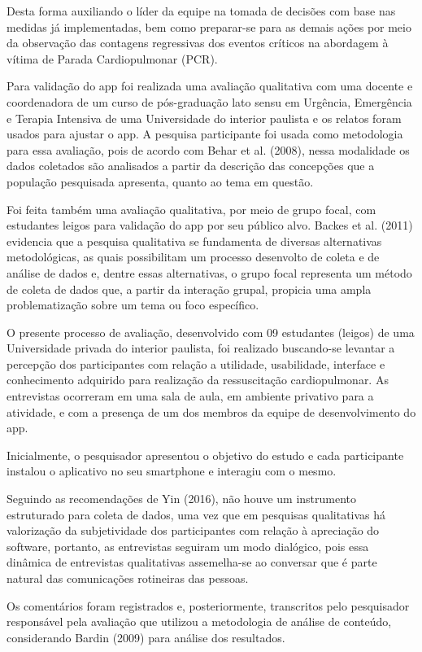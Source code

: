 \documentclass[twoside,twocolumn]{article}
\begin{document}
Desta forma auxiliando o líder da equipe na tomada de decisões com base nas medidas já implementadas, bem como preparar-se para as demais ações por meio da observação das contagens regressivas dos eventos críticos na abordagem à vítima de Parada Cardiopulmonar (PCR).

Para validação do app foi realizada uma avaliação qualitativa com uma docente e coordenadora de  um curso de pós-graduação lato sensu em Urgência, Emergência e Terapia Intensiva de uma Universidade do interior paulista e os relatos foram usados para ajustar o app. A pesquisa  participante foi usada como metodologia para essa avaliação, pois de acordo com Behar et al. (2008), nessa modalidade os dados coletados são analisados a partir da descrição das concepções que a população pesquisada apresenta, quanto ao tema em questão.

Foi feita também uma avaliação qualitativa, por meio de grupo focal, com estudantes leigos para validação do app por seu público alvo. Backes et al. (2011) evidencia que a pesquisa qualitativa se fundamenta de diversas alternativas metodológicas, as quais possibilitam um processo desenvolto de coleta e de análise de dados e, dentre essas alternativas, o grupo focal representa um método de coleta de dados que, a partir da interação grupal, propicia uma ampla problematização sobre um tema ou foco específico.

O presente processo de avaliação, desenvolvido com 09 estudantes (leigos) de uma Universidade privada do interior paulista, foi realizado buscando-se levantar a percepção dos participantes com relação a utilidade, usabilidade, interface e conhecimento adquirido para realização da  ressuscitação cardiopulmonar. As entrevistas ocorreram em uma sala de aula, em ambiente privativo para a atividade, e com a presença de um dos membros da equipe de desenvolvimento do app. 

Inicialmente, o pesquisador apresentou o objetivo do estudo e cada participante instalou o aplicativo no seu smartphone e interagiu com o mesmo.

Seguindo as recomendações de Yin (2016), não houve um instrumento estruturado para coleta de dados, uma vez que em pesquisas qualitativas há valorização da subjetividade dos participantes  com relação à apreciação do software, portanto, as entrevistas seguiram um modo dialógico, pois essa dinâmica de entrevistas qualitativas assemelha-se ao conversar que é parte natural das comunicações rotineiras das pessoas.

Os comentários foram registrados e, posteriormente, transcritos pelo pesquisador responsável pela avaliação que utilizou a metodologia de análise de conteúdo, considerando Bardin (2009) para análise dos resultados. 
\end{document}
